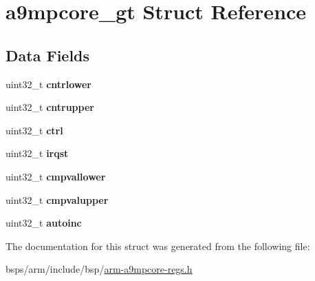 \hypertarget{structa9mpcore__gt}{}\section{a9mpcore\+\_\+gt Struct Reference}
\label{structa9mpcore__gt}
\subsection*{Data Fields}
\begin{DoxyCompactItemize}
\item 
\mbox{\label{structa9mpcore__gt_a8f8ff0f50b2163889815c2dc9bde202b}} 
uint32\+\_\+t {\bfseries cntrlower}
\item 
\mbox{\label{structa9mpcore__gt_a03d3036d9a9c7841706487dc78c20497}} 
uint32\+\_\+t {\bfseries cntrupper}
\item 
\mbox{\label{structa9mpcore__gt_a6e1bda9fb1f8ba7981b218eb49d62fe8}} 
uint32\+\_\+t {\bfseries ctrl}
\item 
\mbox{\label{structa9mpcore__gt_a23a052b5991ee56e5e1be4ed1b798739}} 
uint32\+\_\+t {\bfseries irqst}
\item 
\mbox{\label{structa9mpcore__gt_aa4045d7c86ba73f358bad79a4f17e740}} 
uint32\+\_\+t {\bfseries cmpvallower}
\item 
\mbox{\label{structa9mpcore__gt_a95024f85ee336f78ca1cda47e56a8bf4}} 
uint32\+\_\+t {\bfseries cmpvalupper}
\item 
\mbox{\label{structa9mpcore__gt_af7600e4e2a63556dc89193706c20d55d}} 
uint32\+\_\+t {\bfseries autoinc}
\end{DoxyCompactItemize}


The documentation for this struct was generated from the following file\+:\begin{DoxyCompactItemize}
\item 
bsps/arm/include/bsp/\mbox{\hyperlink{arm-a9mpcore-regs_8h}{arm-\/a9mpcore-\/regs.\+h}}\end{DoxyCompactItemize}
